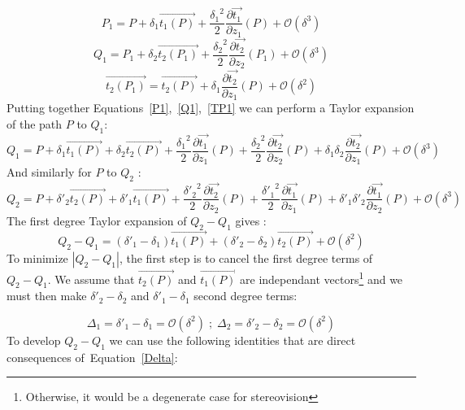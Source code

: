 \documentclass{ipol}
\newcommand{\BigV}[1]{\ensuremath{\overrightarrow{#1}}}
\newcommand{\TanO}[1]{\BigV{t_1#1}}
\newcommand{\TanT}[1]{\BigV{t_2#1}}
\newcommand{\Negl}[1]{\ensuremath{\mathcal{O}(#1)}}
\newcommand{\DerPart}[2]{\frac{\partial #1}{\partial #2}}
\begin{document}
\begin{equation}
    P_1 =  P +  \delta_1 \TanO{(P)} + \frac{{\delta_1}^2}{2} \DerPart { \TanO{}}{z_1}(P)  + \Negl{\delta^3} \label{P1} 
\end{equation}
\begin{equation}
    Q_1 =  P_1 +  \delta_2 \TanT{(P_1)} + \frac{{\delta_2}^2}{2} \DerPart { \TanT{}}{z_2}(P_1) + \Negl{\delta^3} \label{Q1}
\end{equation}
\begin{equation}
     \TanT{(P_1)} = \TanT{(P)} +  \delta_1   \DerPart { \TanT{}}{z_1}(P) + \Negl{\delta^2} \label{TP1}
\end{equation}
%
Putting together Equations~\eqref{P1},~\eqref{Q1},~\eqref{TP1} we can perform a Taylor expansion of the path
$P$ to $Q_1$:
\begin{equation}
    Q_1 =    P +  \delta_1 \TanO{(P)} 
               +  \delta_2 \TanT{(P)} 
               + \frac{{\delta_1}^2}{2} \DerPart { \TanO{}}{z_1}(P) 
               + \frac{{\delta_2}^2}{2} \DerPart { \TanT{}}{z_2}(P) 
               +  \delta_1  \delta_2  \DerPart { \TanT{}}{z_1}(P)  
               + \Negl{\delta^3}
       \label{Q1ofP}
\end{equation}
%
And similarly for $P$ to $Q_2$ :
%
\begin{equation}
    Q_2 =    P +  \delta'_2 \TanT{(P)} 
               +  \delta'_1 \TanO{(P)} 
               + \frac{{\delta'_2}^2}{2} \DerPart { \TanT{}}{z_2}(P) 
               + \frac{{\delta'_1}^2}{2} \DerPart { \TanO{}}{z_1}(P) 
               +  \delta'_1  \delta'_2  \DerPart { \TanO{}}{z_2}(P)  
               + \Negl{\delta^3}
       \label{Q2ofP}
\end{equation}
%
The first degree Taylor expansion of $Q_2-Q_1$ gives :
%
\begin{equation}
    Q_2 -Q_1 =   (\delta'_1 -\delta_1) \TanO{(P)} +  (\delta'_2 -\delta_2) \TanT{(P)}  + \Negl{\delta^2}
\end{equation}
%
To minimize $|Q_2 -Q_1|$, the first step is to cancel the first degree  terms of $ Q_2 -Q_1$. We assume
that $\TanT{(P)}$ and $\TanO{(P)}$  are independant vectors\footnote{Otherwise, it would be a 
degenerate case for stereovision} and we must then make $\delta'_2 -\delta_2$ and $\delta'_1 -\delta_1$ second degree terms:

\begin{equation}
   \Delta_1 =   \delta'_1 -\delta_1 = \Negl{\delta^2}  \; ; \; \Delta_2 =   \delta'_2 -\delta_2 = \Negl{\delta^2}
   \label{Delta}
\end{equation}
%
To develop $ Q_2 -Q_1$ we can use the following identities  that are direct consequences of~Equation~\eqref{Delta}:
\end{document}
